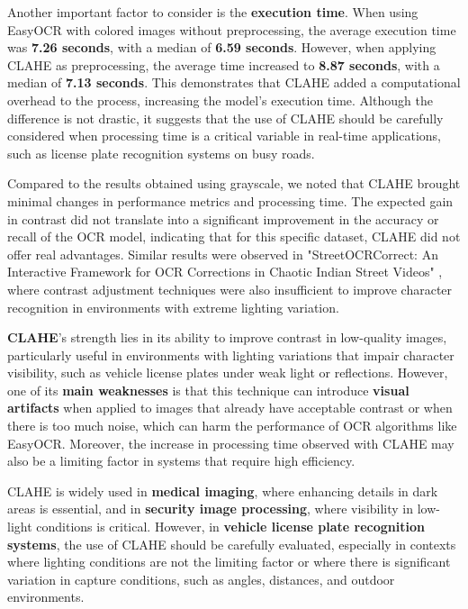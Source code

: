 \documentclass[conference]{IEEEtran}
\begin{document}
	Another important factor to consider is the \textbf{execution time}. When using EasyOCR with colored images without preprocessing, the average execution time was \textbf{7.26 seconds}, with a median of \textbf{6.59 seconds}. However, when applying CLAHE as preprocessing, the average time increased to \textbf{8.87 seconds}, with a median of \textbf{7.13 seconds}. This demonstrates that CLAHE added a computational overhead to the process, increasing the model's execution time. Although the difference is not drastic, it suggests that the use of CLAHE should be carefully considered when processing time is a critical variable in real-time applications, such as license plate recognition systems on busy roads.
	
	Compared to the results obtained using grayscale, we noted that CLAHE brought minimal changes in performance metrics and processing time. The expected gain in contrast did not translate into a significant improvement in the accuracy or recall of the OCR model, indicating that for this specific dataset, CLAHE did not offer real advantages. Similar results were observed in "StreetOCRCorrect: An Interactive Framework for OCR Corrections in Chaotic Indian Street Videos" \cite{b13}, where contrast adjustment techniques were also insufficient to improve character recognition in environments with extreme lighting variation.
	
	\textbf{CLAHE}'s strength lies in its ability to improve contrast in low-quality images, particularly useful in environments with lighting variations that impair character visibility, such as vehicle license plates under weak light or reflections. However, one of its \textbf{main weaknesses} is that this technique can introduce \textbf{visual artifacts} when applied to images that already have acceptable contrast or when there is too much noise, which can harm the performance of OCR algorithms like EasyOCR. Moreover, the increase in processing time observed with CLAHE may also be a limiting factor in systems that require high efficiency.
	
	CLAHE is widely used in \textbf{medical imaging}, where enhancing details in dark areas is essential, and in \textbf{security image processing}, where visibility in low-light conditions is critical. However, in \textbf{vehicle license plate recognition systems}, the use of CLAHE should be carefully evaluated, especially in contexts where lighting conditions are not the limiting factor or where there is significant variation in capture conditions, such as angles, distances, and outdoor environments.
	
\end{document}
